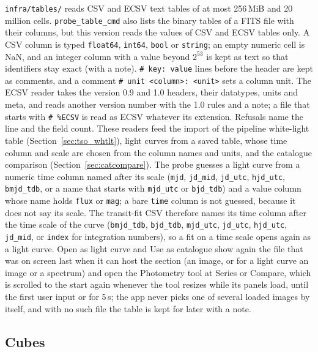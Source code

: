 \documentclass[11pt,a4paper]{article}
\newcommand{\code}[1]{\texttt{\small #1}}
\begin{document}
    \code{infra/tables/} reads CSV and ECSV text tables of at most 256\,MiB and 20 million cells. \code{probe\_table\_cmd} also lists the binary tables of a FITS file with their columns, but this version reads the values of CSV and ECSV tables only. A CSV column is typed \code{float64}, \code{int64}, \code{bool} or \code{string}; an empty numeric cell is NaN, and an integer column with a value beyond $2^{53}$ is kept as text so that identifiers stay exact (with a note). \code{\# key: value} lines before the header are kept as comments, and a comment \code{\# unit <column>: <unit>} sets a column unit. The ECSV reader takes the version 0.9 and 1.0 headers, their datatypes, units and meta, and reads another version number with the 1.0 rules and a note; a file that starts with \code{\# \%ECSV} is read as ECSV whatever its extension. Refusals name the line and the field count. These readers feed the import of the pipeline white-light table (Section~\ref{sec:tso_whtlt}), light curves from a saved table, whose time column and scale are chosen from the column names and units, and the catalogue comparison (Section~\ref{sec:catcompare}). The probe guesses a light curve from a numeric time column named after its scale (\code{mjd}, \code{jd\_mid}, \code{jd\_utc}, \code{hjd\_utc}, \code{bmjd\_tdb}, or a name that starts with \code{mjd\_utc} or \code{bjd\_tdb}) and a value column whose name holds \code{flux} or \code{mag}; a bare \code{time} column is not guessed, because it does not say its scale. The transit-fit CSV therefore names its time column after the time scale of the curve (\code{bmjd\_tdb}, \code{bjd\_tdb}, \code{mjd\_utc}, \code{jd\_utc}, \code{hjd\_utc}, \code{jd\_mid}, or \code{index} for integration numbers), so a fit on a time scale opens again as a light curve. Open as light curve and Use as catalogue show again the file that was on screen last when it can host the section (an image, or for a light curve an image or a spectrum) and open the Photometry tool at Series or Compare, which is scrolled to the start again whenever the tool resizes while its panels load, until the first user input or for 5\,s; the app never picks one of several loaded images by itself, and with no such file the table is kept for later with a note.

    \subsection{Cubes}
\end{document}
